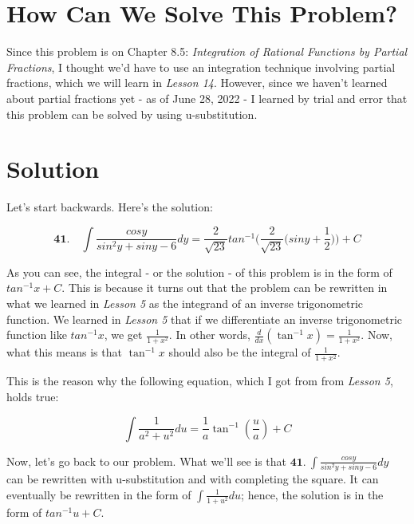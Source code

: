 
\section*{How Can We Solve This Problem?}

Since this problem is on Chapter 8.5: 
\textit{Integration of Rational Functions
by Partial Fractions}, I thought we'd
have to use an integration technique
involving partial fractions, which we will
learn in \textit{Lesson 14}. However,
since we haven't learned about partial fractions
yet - as of June 28, 2022 - I learned
by trial and error that this problem can be 
solved by using u-substitution.

\section*{Solution}
 
Let's start backwards. Here's the solution:

\begin{equation*}
\textbf{41.}\quad \int \frac{cosy}{sin^2y+siny-6} dy =	
	\frac{2}{\sqrt{23}} tan^{-1}\bigg(
		\frac{2}{\sqrt{23}}\big(
			siny+\frac{1}{2}
		\big)
	\bigg) + C
\end{equation*}

As you can see, the integral - or the solution - of 
this problem is in the form of $ tan^{-1}x + C $. 
This is because it turns out that the problem can be 
rewritten in what we learned in \textit{Lesson 5} 
as the integrand of an inverse trigonometric function. 
We learned in \textit{Lesson 5} that if we differentiate
an inverse trigonometric function like $ tan^{-1}x $,
we get $ \frac{1}{1+x^2} $. In other words,
$ \frac{d}{dx}\left( \tan^{-1}x \right) = \frac{1}{1+x^2} $.
Now, what this means is that $ \tan^{-1}x $ should also be the
integral of $ \frac{1}{1+x^2} $. 

This is the reason why the following equation, which I got
from from \textit{Lesson 5}, holds true:

\begin{equation*}
\int \frac{1}{a^2+u^2} du = 
	\frac{1}{a}\tan^{-1}(\frac{u}{a}) + C
\end{equation*}

Now, let's go back to our problem. What we'll see is
that $\textbf{41.}\ \int \frac{cosy}{sin^2y+siny-6} dy $
can be rewritten with u-substitution and with completing
the square. It can eventually be rewritten in the form of 
$ \int \frac{1}{1+u^2} du $; hence, the solution is in the
form of $ tan^{-1}u + C $.
	 
